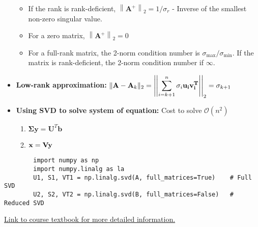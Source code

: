 \documentclass[12pt]{article}
\newcommand\norm[1]{\left\lVert#1\right\rVert}
\begin{document}
\begin{itemize}
\begin{itemize}
                \item If the rank is rank-deficient, $\norm{\mathbf{A}^{+}}_2= 1/{\sigma_r}$ - Inverse of the smallest non-zero singular value.
                \item For a zero matrix, $\norm{\mathbf{A}^+}_2 = 0$
                \item For a full-rank matrix, the 2-norm condition number is $\sigma_{\text{max}} / \sigma_{\text{min}}$. If the matrix is rank-deficient, the 2-norm condition number if $\infty$.
            \end{itemize}
        \item \textbf{Low-rank approximation:} $\displaystyle \|{\bf A} - {\bf A}_k\|_2 = \left|\left|\sum_{i=k+1}^n \sigma_i \bf{u}_i \bf{v}_i^T\right|\right|_2 = \sigma_{k+1}$
        \item \textbf{Using SVD to solve system of equation:} Cost to solve $\mathcal{O}(n^2)$
            \begin{enumerate}
                \item $\mathbf{\Sigma y=U}^T\mathbf{b}$
                \item $\bf{x=Vy}$
            \end{enumerate}
    \end{itemize}

\begin{verbatim}
        import numpy as np
        import numpy.linalg as la
        U1, S1, VT1 = np.linalg.svd(A, full_matrices=True)    # Full SVD
        U2, S2, VT2 = np.linalg.svd(B, full_matrices=False)   # Reduced SVD
\end{verbatim}

\noindent
\href{https://cs357.github.io/textbook/notes/svd.html}{Link to course textbook for more detailed information.}
\end{document}
